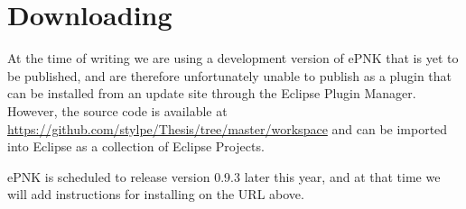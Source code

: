 \chapter{Downloading \thename{}}

At the time of writing we are using a development version of ePNK that is yet to
be published, and are therefore unfortunately unable to publish \thename{} as a
plugin that can be installed from an update site through the Eclipse Plugin Manager. However,
the source code is available at
\mbox{\url{https://github.com/stylpe/Thesis/tree/master/workspace}} and can be
imported into Eclipse as a collection of Eclipse Projects.

ePNK is scheduled to release version 0.9.3 later this year, and at that time we
will add instructions for installing \thename{} on the URL above.